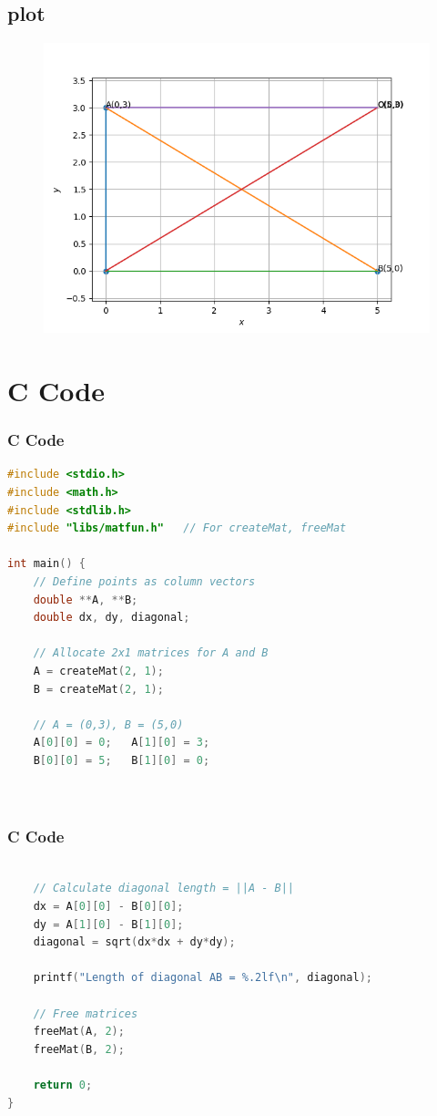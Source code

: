 \documentclass{beamer}
\theoremstyle{remark}
\numberwithin{equation}{section}
\begin{document}
    \subsection{plot}
       \begin{frame}[fragile]
    \begin{figure}[H]
    \centering
    \includegraphics[width = 0.6\columnwidth]{../figs/img.png}
    \caption*{}
    \label{figs}
\end{figure}
\end{frame}
\section{ C Code}
\begin{frame}[fragile]
\frametitle{C Code }
\begin{lstlisting}[language=C]
#include <stdio.h>
#include <math.h>
#include <stdlib.h>
#include "libs/matfun.h"   // For createMat, freeMat

int main() {
    // Define points as column vectors
    double **A, **B;
    double dx, dy, diagonal;

    // Allocate 2x1 matrices for A and B
    A = createMat(2, 1);
    B = createMat(2, 1);

    // A = (0,3), B = (5,0)
    A[0][0] = 0;   A[1][0] = 3;
    B[0][0] = 5;   B[1][0] = 0;

    
\end{lstlisting}
\end{frame}

\begin{frame}[fragile]
\frametitle{C Code }
\begin{lstlisting}[language=C]

    // Calculate diagonal length = ||A - B||
    dx = A[0][0] - B[0][0];
    dy = A[1][0] - B[1][0];
    diagonal = sqrt(dx*dx + dy*dy);

    printf("Length of diagonal AB = %.2lf\n", diagonal);

    // Free matrices
    freeMat(A, 2);
    freeMat(B, 2);

    return 0;
}
\end{lstlisting}
\end{frame}
\end{document}
